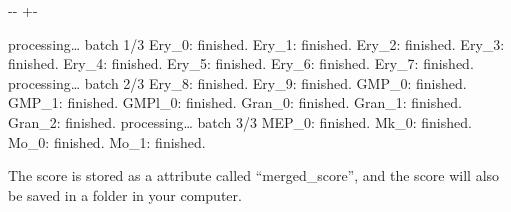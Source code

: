 \documentclass[letterpaper,10pt,english]{sphinxmanual}
\newlength\nbsphinxcodecellspacing
\begin{document}
{

\kern-\sphinxverbatimsmallskipamount\kern-\baselineskip
\kern+\FrameHeightAdjust\kern-\fboxrule
\vspace{\nbsphinxcodecellspacing}

\begin{sphinxVerbatim}[commandchars=\\\{\}]
processing{\ldots} batch 1/3
Ery\_0: finished.
Ery\_1: finished.
Ery\_2: finished.
Ery\_3: finished.
Ery\_4: finished.
Ery\_5: finished.
Ery\_6: finished.
Ery\_7: finished.
processing{\ldots} batch 2/3
Ery\_8: finished.
Ery\_9: finished.
GMP\_0: finished.
GMP\_1: finished.
GMPl\_0: finished.
Gran\_0: finished.
Gran\_1: finished.
Gran\_2: finished.
processing{\ldots} batch 3/3
MEP\_0: finished.
Mk\_0: finished.
Mo\_0: finished.
Mo\_1: finished.
\end{sphinxVerbatim}
}

The score is stored as a attribute called “merged\_score”, and the score will also be saved in a folder in your computer.

{
\begin{sphinxVerbatim}[commandchars=\\\{\}]
\llap{\color{nbsphinxin}[82]:\,\hspace{\fboxrule}\hspace{\fboxsep}}
\end{sphinxVerbatim}
}
\end{document}
